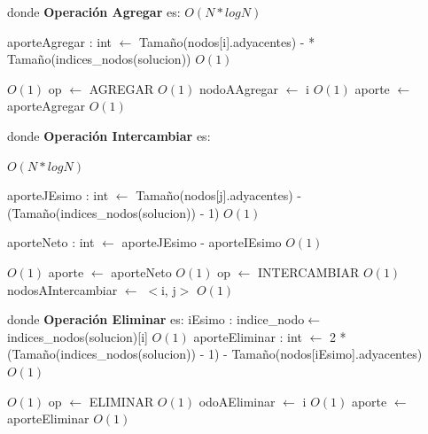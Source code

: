 \documentclass[a4paper, 10pt, twoside]{article}
\newenvironment{pseudo}[1][]{%
    \vspace{1em}%
    \begin{algorithmic}%
}
{%
    \end{algorithmic}%
    \vspace{1em}%
}
\newcommand{\Ode}[1]{\hfill $O(#1)$}
\begin{document}
\begin{pseudo}
\EndProcedure
\State
\State donde \textbf{Operación Agregar} es:
\State
											\Ode{N*log N}

				\State aporteAgregar : int $\leftarrow$ Tamaño(nodos[i].adyacentes) -
				 * Tamaño(indices\_nodos(solucion))															\Ode{1}

																						\Ode{1}
					\State op $\leftarrow$ AGREGAR 																	\Ode{1}
					\State nodoAAgregar $\leftarrow$ i 																\Ode{1}
					\State aporte $\leftarrow$ aporteAgregar														\Ode{1}
				\EndIf
			\EndIf
		\EndFor

\State
\State donde \textbf{Operación Intercambiar} es:
\State

											\Ode{N*log N}

					\State aporteJEsimo : int $\leftarrow$ Tamaño(nodos[j].adyacentes) -
					\State (Tamaño(indices\_nodos(solucion)) - 1)															\Ode{1}

					\State aporteNeto : int $\leftarrow$ aporteJEsimo - aporteIEsimo										\Ode{1}

																									\Ode{1}
						\State aporte $\leftarrow$ aporteNeto																\Ode{1}
						\State op $\leftarrow$ INTERCAMBIAR 																\Ode{1}
						\State nodosAIntercambiar $\leftarrow$ $<$i, j$>$ 													\Ode{1}
					\EndIf
				\EndIf
			\EndFor	

\State
\State donde \textbf{Operación Eliminar} es:
\State
			\State iEsimo : indice\_nodo$\leftarrow$ indices\_nodos(solucion)[i]											\Ode{1}
			\State aporteEliminar : int $\leftarrow$ 2 * (Tamaño(indices\_nodos(solucion)) - 1) - 
			\State Tamaño(nodos[iEsimo].adyacentes)																			\Ode{1}

																								\Ode{1}
				\State op $\leftarrow$ ELIMINAR 																			\Ode{1}
				\State odoAEliminar $\leftarrow$ i 																			\Ode{1}
				\State aporte $\leftarrow$ aporteEliminar 																	\Ode{1}
			\EndIf
		\EndFor


\end{pseudo}
\end{document}
